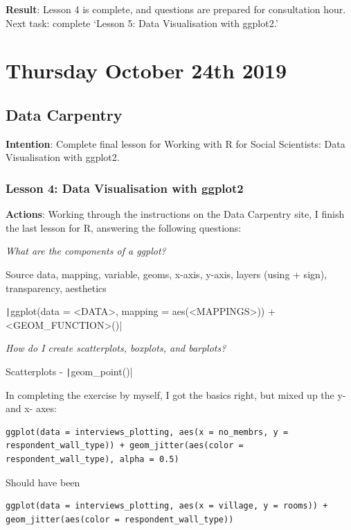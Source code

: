 \documentclass{article}
\begin{document}
\textbf{Result}: Lesson 4 is complete, and questions are prepared for consultation hour. Next task: complete ‘Lesson 5: Data Visualisation with ggplot2.’

\newpage
\section{Thursday October 24th 2019}

\subsection{Data Carpentry}

\textbf{Intention}: Complete final lesson for Working with R for Social Scientists: Data Visualisation with ggplot2.

\subsubsection{Lesson 4: Data Visualisation with ggplot2}

\textbf{Actions}: Working through the instructions on the Data Carpentry site, I finish the last lesson for R, answering the following questions:

\textit{What are the components of a ggplot?}

Source data, mapping, variable, geoms, x-axis, y-axis, layers (using + sign), transparency, aesthetics

\texttt|ggplot(data = <DATA>, mapping = aes(<MAPPINGS>)) +  <GEOM_FUNCTION>()|

\textit{How do I create scatterplots, boxplots, and barplots?}

Scatterplots - \texttt|geom_point()|

In completing the exercise by myself, I got the basics right, but mixed up the y- and x- axes:

\begin{verbatim}
ggplot(data = interviews_plotting, aes(x = no_membrs, y = respondent_wall_type)) + geom_jitter(aes(color = respondent_wall_type), alpha = 0.5)
\end{verbatim}

Should have been
\begin{verbatim}
ggplot(data = interviews_plotting, aes(x = village, y = rooms)) + geom_jitter(aes(color = respondent_wall_type))
\end{verbatim}
\end{document}
